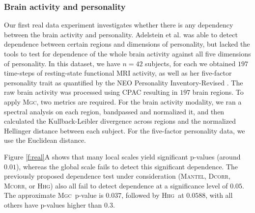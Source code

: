 \documentclass[11pt]{article}
\providecommand{\sct}[1]{{\normalfont\textsc{#1}}}
\newcommand{\Mgc}{\sct{Mgc}}
\newcommand{\Hhg}{\sct{Hhg}}
\newcommand{\Dcorr}{\sct{Dcorr}}
\newcommand{\Mcorr}{\sct{Mcorr}}
\newcommand{\Mantel}{\sct{Mantel}}
\begin{document}
\subsubsection*{Brain activity and personality} %
Our first real data experiment investigates whether there is any dependency between the brain activity and personality.
Adelstein et al. \cite{AdelsteinEtAl2011} was able to detect dependence between certain regions and dimensions of personality, but lacked the tools to test for dependence of the whole brain activity against all five dimensions of personality. 
In this dataset, we have $n=42$ subjects, for each we obtained  $197$ time-steps of resting-state functional MRI activity, as well as her five-factor personality trait as quantified by  the NEO Personality Inventory-Revised  \cite{Costa1992}. 
The raw brain activity was processed using CPAC \cite{CPAC2015} resulting in $197$ brain regions.
To apply \Mgc, two metrics are required. For the brain activity modality, we ran a spectral analysis on each region, bandpassed and normalized it, and then calculated the Kullback-Leibler divergence across regions and the normalized Hellinger distance between each subject. 
For the five-factor personality data, we  use the Euclidean distance.




Figure \ref{f:real}A  shows that many local scales yield significant p-values (around $0.01$), whereas the global scale fails to detect this significant dependence. The previously proposed dependence test under consideration (\Mantel, \Dcorr, \Mcorr, or \Hhg) also all fail to detect dependence at a significance level of $0.05$. The approximate \Mgc~p-value is $0.037$, followed by \Hhg~at $0.0588$, with all others have p-values higher than $0.3$.
\end{document}
